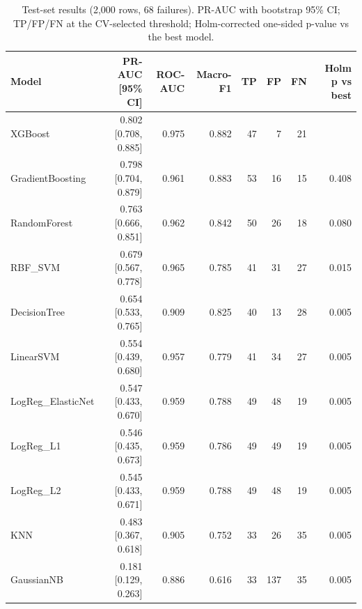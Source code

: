 \begin{table}[ht]
\centering
\small
\caption{Test-set results (2,000 rows, 68 failures). PR-AUC with bootstrap 95\% CI; TP/FP/FN at the CV-selected threshold; Holm-corrected one-sided p-value vs the best model.}
\label{tab:main_results}
\begin{tabular}{lrrrrrrr}
\toprule
Model & PR-AUC [95\% CI] & ROC-AUC & Macro-F1 & TP & FP & FN & Holm p vs best \\
\midrule
XGBoost & 0.802 [0.708, 0.885] & 0.975 & 0.882 & 47 & 7 & 21 &  \\
GradientBoosting & 0.798 [0.704, 0.879] & 0.961 & 0.883 & 53 & 16 & 15 & 0.408 \\
RandomForest & 0.763 [0.666, 0.851] & 0.962 & 0.842 & 50 & 26 & 18 & 0.080 \\
RBF\_SVM & 0.679 [0.567, 0.778] & 0.965 & 0.785 & 41 & 31 & 27 & 0.015 \\
DecisionTree & 0.654 [0.533, 0.765] & 0.909 & 0.825 & 40 & 13 & 28 & 0.005 \\
LinearSVM & 0.554 [0.439, 0.680] & 0.957 & 0.779 & 41 & 34 & 27 & 0.005 \\
LogReg\_ElasticNet & 0.547 [0.433, 0.670] & 0.959 & 0.788 & 49 & 48 & 19 & 0.005 \\
LogReg\_L1 & 0.546 [0.435, 0.673] & 0.959 & 0.786 & 49 & 49 & 19 & 0.005 \\
LogReg\_L2 & 0.545 [0.433, 0.671] & 0.959 & 0.788 & 49 & 48 & 19 & 0.005 \\
KNN & 0.483 [0.367, 0.618] & 0.905 & 0.752 & 33 & 26 & 35 & 0.005 \\
GaussianNB & 0.181 [0.129, 0.263] & 0.886 & 0.616 & 33 & 137 & 35 & 0.005 \\
\bottomrule
\end{tabular}
\end{table}
